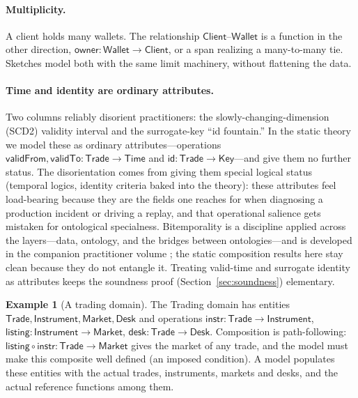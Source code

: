 \documentclass[11pt]{article}
\theoremstyle{plain}
\theoremstyle{definition}
\newtheorem{example}{Example}
\newcommand{\Trade}{\mathsf{Trade}}
\newcommand{\Inst}{\mathsf{Instrument}}
\newcommand{\Client}{\mathsf{Client}}
\newcommand{\Wallet}{\mathsf{Wallet}}
\begin{document}
\paragraph{Multiplicity.} A client holds many wallets. The relationship $\Client$--$\Wallet$ is a function in the other direction, $\mathsf{owner}\colon \Wallet \to \Client$, or a span realizing a many-to-many tie. Sketches model both with the same limit machinery, without flattening the data.

\paragraph{Time and identity are ordinary attributes.} Two columns reliably disorient practitioners: the slowly-changing-dimension (SCD2) validity interval and the surrogate-key ``id fountain.'' In the static theory we model these as ordinary attributes---operations $\mathsf{validFrom},\mathsf{validTo}\colon \Trade \to \mathsf{Time}$ and $\mathsf{id}\colon \Trade \to \mathsf{Key}$---and give them no further status. The disorientation comes from giving them special logical status (temporal logics, identity criteria baked into the theory): these attributes feel load-bearing because they are the fields one reaches for when diagnosing a production incident or driving a replay, and that operational salience gets mistaken for ontological specialness. Bitemporality is a discipline applied across the layers---data, ontology, and the bridges between ontologies---and is developed in the companion practitioner volume \cite{semantic-enterprise}; the static composition results here stay clean because they do not entangle it. Treating valid-time and surrogate identity as attributes keeps the soundness proof (Section~\ref{sec:soundness}) elementary.

\begin{example}[A trading domain]\label{ex:trading}
The Trading domain has entities $\Trade,\Inst,\mathsf{Market},\mathsf{Desk}$ and operations $\mathsf{instr}\colon\Trade\to\Inst$, $\mathsf{listing}\colon\Inst\to\mathsf{Market}$, $\mathsf{desk}\colon\Trade\to\mathsf{Desk}$. Composition is path-following: $\mathsf{listing}\circ\mathsf{instr}\colon\Trade\to\mathsf{Market}$ gives the market of any trade, and the model must make this composite well defined (an imposed condition). A model populates these entities with the actual trades, instruments, markets and desks, and the actual reference functions among them.
\end{example}
\end{document}

